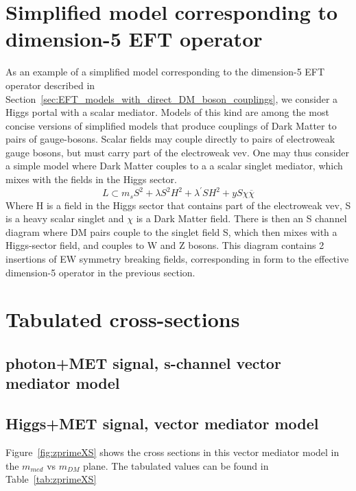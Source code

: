 \section{Simplified model corresponding to dimension-5 EFT operator}


As an example of a simplified model corresponding to the dimension-5 EFT operator 
described in Section~\ref{sec:EFT_models_with_direct_DM_boson_couplings}, 
we consider a Higgs portal with a scalar mediator. Models of this kind
are among the most concise versions of simplified models that produce 
couplings of Dark Matter to pairs of gauge-bosons.  Scalar fields may couple directly to pairs of electroweak gauge bosons, 
but must carry part of the electroweak vev.  One may thus consider a simple model where Dark Matter couples to a a scalar 
singlet mediator, which mixes with the fields in the Higgs sector.
\begin{equation}
L\subset m_s S^2 + \lambda S^2H^2 +\lambda^{'} S H^2 + y S \chi \overline{\chi}
\end{equation}
Where H is a field in the Higgs sector that contains part of the electroweak vev, 
S is a heavy scalar singlet and $\chi$ is a Dark Matter field. 
There is then an S channel diagram where DM pairs couple to the singlet field S, 
which then mixes with a Higgs-sector field, and couples to W and Z bosons. 
This diagram contains 2 insertions of EW symmetry breaking fields, 
corresponding in form to the effective dimension-5 operator in the previous section.   

\section{Tabulated cross-sections}

\subsection{photon+MET signal, s-channel vector mediator model}

\subsection{Higgs+MET signal, vector mediator model}

Figure~\ref{fig:zprimeXS} shows the cross sections in this vector mediator model in the $m_{med}$ 
vs $m_{DM}$ plane. The tabulated values can be found in Table~\ref{tab:zprimeXS}

